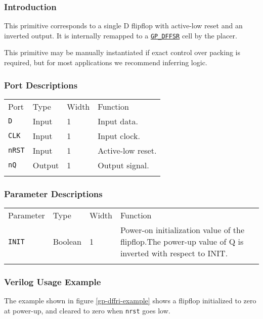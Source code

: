 \documentclass[11pt]{article}
\newcommand{\tokenstyle}[1]{\texttt{#1}}
\newcommand{\wirestyle}[1]{\texttt{#1}}
\newcommand{\whenstyle}[1]{{\fontseries{sb}\selectfont#1}}
\newcommand{\tokenref}[2]{\hyperref[#2]{\tokenstyle{#1}}}
\newcommand{\thinhline}{\Xhline{1\arrayrulewidth}}
\newcommand{\thickhline}{\Xhline{2.5\arrayrulewidth}}
\begin{document}
\subsubsection{Introduction}
This primitive corresponds to a single D flipflop with active-low reset and an inverted output. It is internally
remapped to a \tokenref{GP\_DFFSR}{gp-dffsr} cell by the placer.

This primitive may be manually instantiated if exact control over packing is required, but for most applications we
recommend inferring logic.

\subsubsection{Port Descriptions}

\begin{tabularx}{\textwidth}{lllX}
\thinhline
\whenstyle{Port} & \whenstyle{Type} & \whenstyle{Width} & \whenstyle{Function} \\
\thickhline
\tokenstyle{D} & Input & 1 & Input data. \\
\thinhline
\tokenstyle{CLK} & Input & 1 & Input clock. \\
\thinhline
\tokenstyle{nRST} & Input & 1 & Active-low reset. \\
\thinhline
\tokenstyle{nQ} & Output & 1 & Output signal. \\
\thinhline
\end{tabularx}

\subsubsection{Parameter Descriptions}

\begin{tabularx}{\textwidth}{lllX}
\thinhline
\whenstyle{Parameter} & \whenstyle{Type} & \whenstyle{Width} & \whenstyle{Function} \\
\thickhline
\tokenstyle{INIT} & Boolean & 1 & Power-on initialization value of the flipflop.\newline The power-up value of Q is inverted
with respect to INIT.\\
\thinhline
\end{tabularx}

\subsubsection{Verilog Usage Example}

The example shown in figure \ref{gp-dffri-example} shows a flipflop initialized to zero at power-up, and cleared to zero
when \wirestyle{nrst} goes low.
\end{document}

